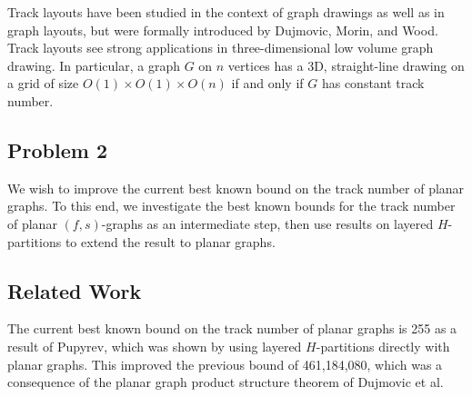 \documentclass[../main.tex]{subfiles}
\begin{document}
	Track layouts have been studied in the context of graph drawings\cite{GLM05, FLW-JGAA03} as well as in graph layouts\cite{HR92}, but were formally introduced by Dujmovic, Morin, and Wood\cite{DMW05}. Track layouts see strong applications in three-dimensional low volume graph drawing. In particular, a graph $G$ on $n$ vertices has a 3D, straight-line drawing on a grid of size $O(1)\times O(1)\times O(n)$ if and only if $G$ has constant track number.
	
	\subsection{Problem 2}
	We wish to improve the current best known bound on the track number of planar graphs. To this end, we investigate the best known bounds for the track number of planar $(f,s)$-graphs as an intermediate step, then use results on layered $H$-partitions to extend the result to planar graphs.
	
	\subsection{Related Work}
	The current best known bound on the track number of planar graphs is 255 as a result of Pupyrev\cite{Pupyrev20}, which was shown by using layered $H$-partitions directly with planar graphs. This improved the previous bound of 461,184,080, which was a consequence of the planar graph product structure theorem of Dujmovic et al.\cite{DJMMUW19}
	
	
	
	
\end{document}
